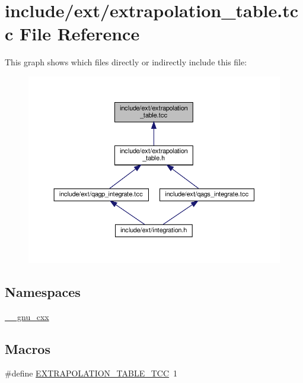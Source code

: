 \hypertarget{extrapolation__table_8tcc}{}\section{include/ext/extrapolation\+\_\+table.tcc File Reference}
\label{extrapolation__table_8tcc}
This graph shows which files directly or indirectly include this file\+:
\nopagebreak
\begin{figure}[H]
\begin{center}
\leavevmode
\includegraphics[width=350pt]{extrapolation__table_8tcc__dep__incl}
\end{center}
\end{figure}
\subsection*{Namespaces}
\begin{DoxyCompactItemize}
\item 
 \hyperlink{namespace____gnu__cxx}{\+\_\+\+\_\+gnu\+\_\+cxx}
\end{DoxyCompactItemize}
\subsection*{Macros}
\begin{DoxyCompactItemize}
\item 
\#define \hyperlink{extrapolation__table_8tcc_ab99f24f7cb464f1e3ae40b745db8df16}{E\+X\+T\+R\+A\+P\+O\+L\+A\+T\+I\+O\+N\+\_\+\+T\+A\+B\+L\+E\+\_\+\+T\+CC}~1
\end{DoxyCompactItemize}


